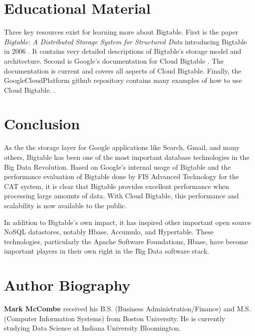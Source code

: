 \documentclass[9pt,twocolumn,twoside]{../../styles/osajnl}
\begin{document}
\section{Educational Material}

Three key resources exist for learning more about Bigtable. First is the paper \emph{Bigtable: A Distributed Storage System for Structured Data} introducing Bigtable in 2006 \cite{introbigtable}.  It contains very detailed descriptions of Bigtable's storage model and architecture. Second is Google's documentation for Cloud Bigtable \cite{www-bigtabledocumentation}.  The documentation is current and covers all aspects of Cloud Bigtable. Finally, the GoogleCloudPlatform github repository contains many examples of how to use Cloud Bigtable. \cite{git-googlecloud}.

\section{Conclusion}

As the the storage layer for Google applications like Search, Gmail, and many others, Bigtable has been one of the most important database technologies in the Big Data Revolution. Based on Google's internal usage of Bigtable and the performance evaluation of Bigtable done by FIS Advanced Technology for the CAT system, it is clear that Bigtable provides excellent performance when processing large amounts of data. With Cloud Bigtable, this performance and scalability is now available to the public.  

In addition to Bigtable's own impact, it has inspired other important open source NoSQL datastores, notably Hbase, Accumulo, and Hypertable.  These technologies, particularly the Apache Software Foundations, Hbase, have become important players in their own right in the Big Data software stack. 



 
\section*{Author Biography}
\begingroup
\setlength\intextsep{0pt}
\begin{minipage}[t][3.2cm][t]{1.0\columnwidth} %
  \noindent
  {\bfseries Mark McCombe} received his B.S. (Business Administration/Finance) and M.S. (Computer Information Systems) from Boston University.  He is currently studying Data Science at Indiana University Bloomington.
\end{minipage}
\endgroup

\newpage

\appendix
\end{document}
